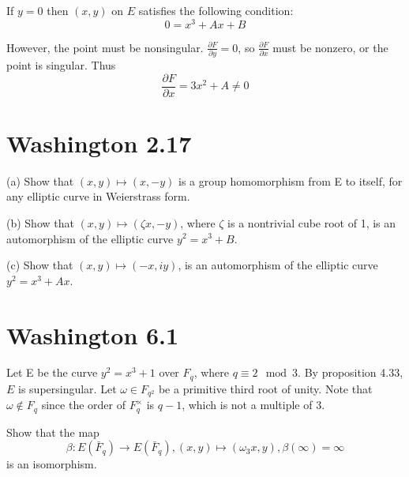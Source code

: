 \documentclass{article}
\begin{document}
If $y = 0$ then $(x,y)$ on $E$ satisfies the following condition:
$$0 = x^3 + Ax + B$$

However, the point must be nonsingular. $\frac{\partial F}{\partial y} = 0$, so $\frac{\partial F}{\partial x}$ must be nonzero, or the point is singular. Thus
$$\frac{\partial F}{\partial x} = 3x^2 + A \neq 0$$

\section{Washington 2.17}
(a) Show that $(x,y) \mapsto (x,−y)$ is a group homomorphism from E to itself, for any elliptic curve in Weierstrass form.

(b) Show that $(x,y) \mapsto (\zeta x,−y)$, where $\zeta$ is a nontrivial cube root of 1, is an automorphism of the elliptic curve $y^2 = x^3 + B$.

(c) Show that $(x, y) \mapsto (−x, iy)$, is an automorphism of the elliptic curve $y^2 = x^3 + Ax$.

\section{Washington 6.1}
Let E be the curve $y^2 = x^3+1$ over $F_q$, where $q \equiv 2 \mod 3$. By proposition 4.33, $E$ is supersingular. Let $\omega \in F_{q^2}$ be a primitive third root of unity. Note that $\omega \not \in F_q$ since the order of $F_q^\times$ is $q−1$, which is not a multiple of $3$.

Show that the map
$$\beta: E(\bar F_q) \to E(\bar F_q), (x,y) \mapsto (\omega_3 x, y), \beta(\infty) = \infty$$
is an isomorphism.
\end{document}
